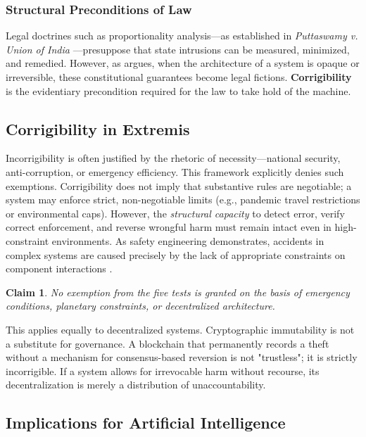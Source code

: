 \documentclass{article}
\newtheorem{claim}{Claim}
\begin{document}
\subsubsection{Structural Preconditions of Law}
Legal doctrines such as proportionality analysis---as established in \textit{Puttaswamy v. Union of India} \citep{puttaswamy2017}---presuppose that state intrusions can be measured, minimized, and remedied. However, as \citet{bhatia2019} argues, when the architecture of a system is opaque or irreversible, these constitutional guarantees become legal fictions. \textbf{Corrigibility} is the evidentiary precondition required for the law to take hold of the machine.

\subsection{Corrigibility in Extremis}

Incorrigibility is often justified by the rhetoric of necessity---national security, anti-corruption, or emergency efficiency. This framework explicitly denies such exemptions. Corrigibility does not imply that substantive rules are negotiable; a system may enforce strict, non-negotiable limits (e.g., pandemic travel restrictions or environmental caps). However, the \textit{structural capacity} to detect error, verify correct enforcement, and reverse wrongful harm must remain intact even in high-constraint environments. As safety engineering demonstrates, accidents in complex systems are caused precisely by the lack of appropriate constraints on component interactions \citep{leveson2011}.

\begin{claim}
No exemption from the five tests is granted on the basis of emergency conditions, planetary constraints, or decentralized architecture.
\end{claim}

This applies equally to decentralized systems. Cryptographic immutability is not a substitute for governance. A blockchain that permanently records a theft without a mechanism for consensus-based reversion is not "trustless"; it is strictly incorrigible. If a system allows for irrevocable harm without recourse, its decentralization is merely a distribution of unaccountability.

\subsection{Implications for Artificial Intelligence}
\end{document}
